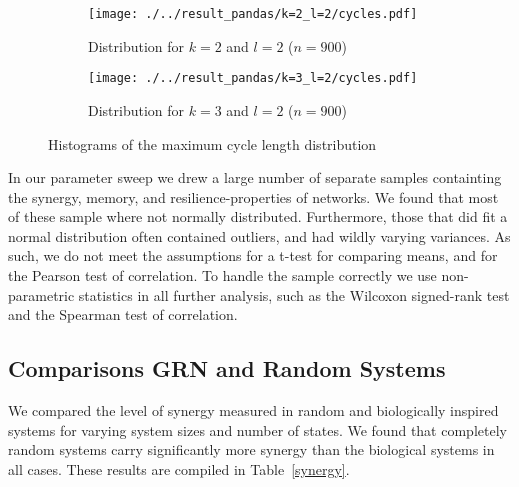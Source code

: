 \documentclass[../main.tex]{subfiles}
\begin{document}
\begin{figure}[H]
    \centering
    \begin{subfigure}[b]{0.4\textwidth}
        \texttt{[image: ./../result\_pandas/k=2\_l=2/cycles.pdf]}
        \caption{Distribution for $k=2$ and $l=2$ ($n=900$)}
    \end{subfigure}
    \begin{subfigure}[b]{0.4\textwidth}
        \texttt{[image: ./../result\_pandas/k=3\_l=2/cycles.pdf]}
        \caption{Distribution for $k=3$ and $l=2$ ($n=900$)}
    \end{subfigure}
    \caption{Histograms of the maximum cycle length distribution}
    \label{fig:cycles}
\end{figure}


In our parameter sweep we drew a large number of separate samples containting the synergy, memory, and resilience-properties of networks.
We found that most of these sample where not normally distributed.
Furthermore, those that did fit a normal distribution often contained outliers, and had wildly varying variances.
As such, we do not meet the assumptions for a t-test for comparing means, and for the Pearson test of correlation.
To handle the sample correctly we use non-parametric statistics in all further analysis, such as the Wilcoxon signed-rank test and the Spearman test of correlation. %

\subsection{Comparisons GRN and Random Systems}

We compared the level of synergy measured in random and biologically inspired systems for varying system sizes and number of states.
We found that completely random systems carry significantly more synergy than the biological systems in all cases.
These results are compiled in Table~\ref{synergy}.
\end{document}
